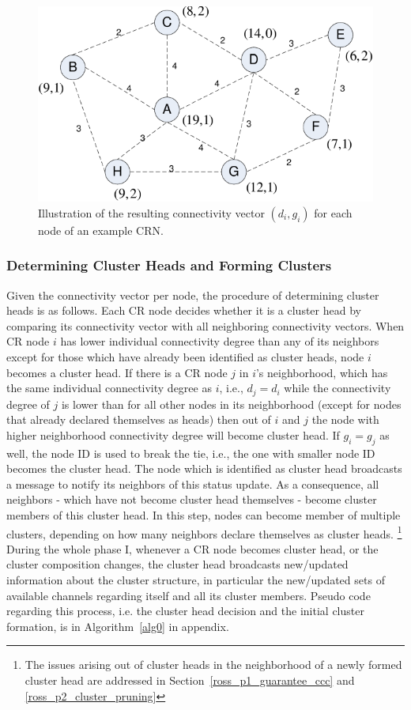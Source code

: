 \documentclass[times]{ettauth}
\newcommand{\ie}{i.e., }
\theoremstyle{mytheoremstyle}
\theoremstyle{mytheoremstyle}
\theoremstyle{mytheoremstyle}
\begin{document}
\begin{figure}[ht!]
  \centering
\includegraphics[width=0.7\linewidth]{figure1.pdf}
	\caption{Illustration of the resulting connectivity vector $(d_i, g_i)$ for each node of an example CRN.}
	\label{fig1}
\end{figure}

\subsubsection{Determining Cluster Heads and Forming Clusters}
Given the connectivity vector per node, the procedure of determining cluster heads is as follows.
Each CR node decides whether it is a cluster head by comparing its connectivity vector with all neighboring connectivity vectors.
When CR node $i$ has lower individual connectivity degree than any of its neighbors except for those which have already been identified as cluster heads, node $i$ becomes a cluster head.
If there is a CR node $j$ in $i$'s neighborhood, which has the same individual connectivity degree as $i$, \ie $d_j = d_i$ while the connectivity degree of $j$ is lower than for all other nodes in its neighborhood (except for nodes that already declared themselves as heads) then out of $i$ and $j$ the node with higher neighborhood connectivity degree will become cluster head.
If $g_i = g_j$ as well, the node ID is used to break the tie, \ie the one with smaller node ID becomes the cluster head.
%
The node which is identified as cluster head broadcasts a message to notify its neighbors of this status update. 
As a consequence, all neighbors - which have not become cluster head themselves -  become cluster members of this cluster head.
In this step, nodes can become member of multiple clusters, depending on how many neighbors declare themselves as cluster heads.
\footnote{The issues arising out of cluster heads in the neighborhood of a newly formed cluster head are addressed in Section~\ref{ross_p1_guarantee_ccc} and \ref{ross_p2_cluster_pruning}}
During the whole phase I, whenever a CR node becomes cluster head, or the cluster composition changes, the cluster head broadcasts new/updated information about the cluster structure, in particular the new/updated sets of available channels regarding itself and all its cluster members.
Pseudo code regarding this process, i.e. the cluster head decision and the initial cluster formation, is in Algorithm~\ref{alg0} in appendix.
\end{document}
